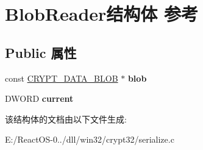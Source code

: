 \hypertarget{struct_blob_reader}{}\section{Blob\+Reader结构体 参考}
\label{struct_blob_reader}
\subsection*{Public 属性}
\begin{DoxyCompactItemize}
\item 
\mbox{\label{struct_blob_reader_ad369c8cd9f8ebb12f85eabba103ce2f7}} 
const \hyperlink{struct___c_r_y_p_t_o_a_p_i___b_l_o_b}{C\+R\+Y\+P\+T\+\_\+\+D\+A\+T\+A\+\_\+\+B\+L\+OB} $\ast$ {\bfseries blob}
\item 
\mbox{\label{struct_blob_reader_af858e23e365de7b467542ae23fa4e1ab}} 
D\+W\+O\+RD {\bfseries current}
\end{DoxyCompactItemize}


该结构体的文档由以下文件生成\+:\begin{DoxyCompactItemize}
\item 
E\+:/\+React\+O\+S-\/0../dll/win32/crypt32/serialize.\+c\end{DoxyCompactItemize}

